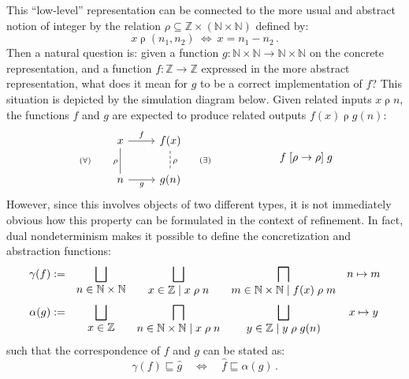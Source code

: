 \documentclass[11pt,oneside]{book}
\theoremstyle{definition}
\newcommand{\ifr}[1]{\mathrel{[{#1}]}}
\newcommand{\refby}{\sqsubseteq} %
\begin{document}
This ``low-level'' representation can be connected
to the more usual and abstract notion of integer
by the relation
$\rho \subseteq \mathbb{Z} \times (\mathbb{N} \times \mathbb{N})$
defined by:
\[
  x \mathrel{\rho} (n_1, n_2)
  \: \Leftrightarrow \:
  x = n_1 - n_2
  \,.
\]
Then a natural question is:
given a function
$g : \mathbb{N} \times \mathbb{N} \rightarrow
     \mathbb{N} \times \mathbb{N}$
on the concrete representation,
and a function
$f : \mathbb{Z} \rightarrow \mathbb{Z}$
expressed in the more abstract representation,
what does it mean for $g$ to be a correct implementation of $f$?
This situation is depicted by the simulation diagram below.
Given related inputs $x \mathrel{\rho} n$,
the functions $f$ and $g$ are expected to produce
related outputs $f(x) \mathrel{\rho} g(n)$:
\[
  \begin{tikzcd}
    x \ar[r, "f"] \ar[d, "(\forall) \qquad \rho"', dash] &
    f(x) \ar[d, "\rho \qquad (\exists)", dash, dashed] \\
    n \ar[r, "g"'] &
    g(n)
  \end{tikzcd}
  \qquad \qquad \qquad
  f \ifr{\rho \rightarrow \rho} g
\]
However,
since this involves objects of two different types,
it is not immediately obvious how this property can be formulated
in the context of refinement.
In fact, dual nondeterminism makes it possible to define
the concretization and abstraction functions:
\[
  \begin{array}{rcccc}
    \gamma(f) := &
      \displaystyle
      \bigsqcup_{\mbox{$n \in \mathbb{N} \times \mathbb{N}$}} &
      \displaystyle
      \bigsqcup_{\mbox{$x \in \mathbb{Z} \mid x \mathrel{\rho} n$}} &
      \displaystyle
      \bigsqcap_{\mbox{$m \in \mathbb{N} \times \mathbb{N} \mid
                 f(x) \mathrel{\rho} m$}} &
      n \mapsto m
    \vspace{0.6em}
    \\
    \alpha(g) := &
      \displaystyle
      \bigsqcup_{\mbox{$x \in \mathbb{Z}$}} &
      \displaystyle
      \bigsqcap_{\mbox{$n \in \mathbb{N} \times \mathbb{N} \mid
        x \mathrel{\rho} n$}} &
      \displaystyle
      \bigsqcup_{\mbox{$y \in \mathbb{Z} \mid
        y \mathrel{\rho} g(n)$}} &
      x \mapsto y
  \end{array}
\]
such that the correspondence of $f$ and $g$ can be stated as:
\[
  \gamma(f) \sqsubseteq \hat{g}
  \quad \Leftrightarrow \quad
  \hat{f} \refby \alpha(g)
  \,.
\]


\end{document}
